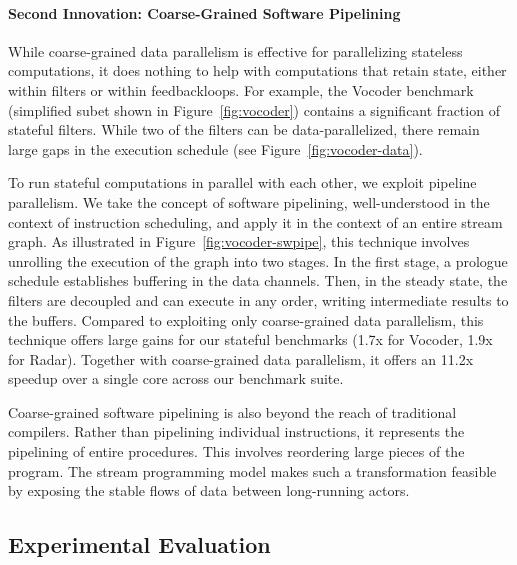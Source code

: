 \paragraph*{Second Innovation: Coarse-Grained Software Pipelining} While 
coarse-grained data parallelism is effective for parallelizing
stateless computations, it does nothing to help with computations that
retain state, either within filters or within feedbackloops.  For
example, the Vocoder benchmark (simplified subet shown in
Figure~\ref{fig:vocoder}) contains a significant fraction of stateful
filters.  While two of the filters can be data-parallelized, there
remain large gaps in the execution schedule (see
Figure~\ref{fig:vocoder-data}).

To run stateful computations in parallel with each other, we exploit
pipeline parallelism.  We take the concept of software pipelining,
well-understood in the context of instruction scheduling, and apply it
in the context of an entire stream graph.  As illustrated in
Figure~\ref{fig:vocoder-swpipe}, this technique involves unrolling the
execution of the graph into two stages.  In the first stage, a
prologue schedule establishes buffering in the data channels.  Then,
in the steady state, the filters are decoupled and can execute in any
order, writing intermediate results to the buffers.  Compared to
exploiting only coarse-grained data parallelism, this technique offers
large gains for our stateful benchmarks (1.7x for Vocoder, 1.9x for
Radar).  Together with coarse-grained data parallelism, it offers an
11.2x speedup over a single core across our benchmark suite.

Coarse-grained software pipelining is also beyond the reach of
traditional compilers.  Rather than pipelining individual
instructions, it represents the pipelining of entire procedures.  This
involves reordering large pieces of the program.  The stream
programming model makes such a transformation feasible by exposing the
stable flows of data between long-running actors.

\subsection*{Experimental Evaluation}


